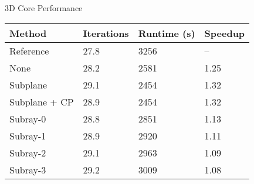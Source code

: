 
\begin{frame}[t]{3D Core Performance}

\begin{table}[h]
    \begin{tabular}{l l l l}\toprule
        Method & Iterations & Runtime (s) & Speedup \\\midrule
        Reference     & 27.8 & 3256 & -- \\
        None          & 28.2 & 2581 & 1.25 \\
        Subplane      & 29.1 & 2454 & 1.32 \\
        Subplane + CP & 28.9 & 2454 & 1.32 \\
        Subray-0      & 28.8 & 2851 & 1.13 \\
        Subray-1      & 28.9 & 2920 & 1.11 \\
        Subray-2      & 29.1 & 2963 & 1.09 \\
        Subray-3      & 29.2 & 3009 & 1.08 \\
        \bottomrule
    \end{tabular}
\end{table}
\vfill

\end{frame}